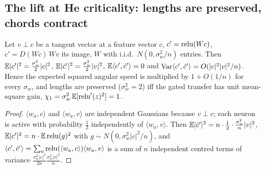 \subsection{The lift at He criticality: lengths are preserved, chords contract}
\begin{proposition}\label{prop:gain}
Let $v\perp c$ be a tangent vector at a feature vector $c$, $c'=\operatorname{relu}(Wc)$, $\dot c'=D(Wc)\,Wv$ its image,
$W$ with i.i.d.\ $N(0,\sigma_w^2/n)$ entries. Then $\mathbb E|c'|^2=\tfrac{\sigma_w^2}2|c|^2$, $\mathbb E|\dot c'|^2=
\tfrac{\sigma_w^2}2|v|^2$, $\mathbb E\langle c',\dot c'\rangle=0$ and $\operatorname{Var}\langle c',\dot c'\rangle=O(|c|^2|v|^2/n)$. Hence the
expected squared angular speed is multiplied by $1+O(1/n)$ for every $\sigma_w$, and lengths are preserved
($\sigma_w^2=2$) iff the gated transfer has unit mean-square gain, $\chi_1=\sigma_w^2\,\mathbb E[\operatorname{relu}'(z)^2]=1$.
\end{proposition}
\begin{proof}
$\langle w_a,c\rangle$ and $\langle w_a,v\rangle$ are independent Gaussians because $v\perp c$; each neuron is active
with probability $\tfrac12$ independently of $\langle w_a,v\rangle$. Then $\mathbb E|\dot c'|^2=n\cdot\tfrac12\cdot
\tfrac{\sigma_w^2}n|v|^2$, $\mathbb E|c'|^2=n\cdot\mathbb E\operatorname{relu}(g)^2$ with $g\sim N(0,\sigma_w^2|c|^2/n)$, and
$\langle c',\dot c'\rangle=\sum_a\operatorname{relu}(\langle w_a,c\rangle)\langle w_a,v\rangle$ is a sum of $n$ independent centred terms
of variance $\tfrac{\sigma_w^2|c|^2}{2n}\tfrac{\sigma_w^2|v|^2}{n}$.
\end{proof}

